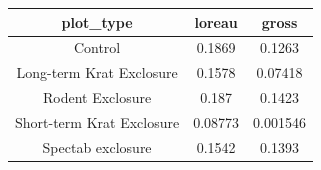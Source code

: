 \documentclass[]{article}
\begin{document}
\begin{longtable}[]{@{}ccc@{}}
\toprule
\begin{minipage}[b]{0.33\columnwidth}\centering\strut
plot\_type\strut
\end{minipage} & \begin{minipage}[b]{0.11\columnwidth}\centering\strut
loreau\strut
\end{minipage} & \begin{minipage}[b]{0.11\columnwidth}\centering\strut
gross\strut
\end{minipage}\tabularnewline
\midrule
\endhead
\begin{minipage}[t]{0.33\columnwidth}\centering\strut
Control\strut
\end{minipage} & \begin{minipage}[t]{0.11\columnwidth}\centering\strut
0.1869\strut
\end{minipage} & \begin{minipage}[t]{0.11\columnwidth}\centering\strut
0.1263\strut
\end{minipage}\tabularnewline
\begin{minipage}[t]{0.33\columnwidth}\centering\strut
Long-term Krat Exclosure\strut
\end{minipage} & \begin{minipage}[t]{0.11\columnwidth}\centering\strut
0.1578\strut
\end{minipage} & \begin{minipage}[t]{0.11\columnwidth}\centering\strut
0.07418\strut
\end{minipage}\tabularnewline
\begin{minipage}[t]{0.33\columnwidth}\centering\strut
Rodent Exclosure\strut
\end{minipage} & \begin{minipage}[t]{0.11\columnwidth}\centering\strut
0.187\strut
\end{minipage} & \begin{minipage}[t]{0.11\columnwidth}\centering\strut
0.1423\strut
\end{minipage}\tabularnewline
\begin{minipage}[t]{0.33\columnwidth}\centering\strut
Short-term Krat Exclosure\strut
\end{minipage} & \begin{minipage}[t]{0.11\columnwidth}\centering\strut
0.08773\strut
\end{minipage} & \begin{minipage}[t]{0.11\columnwidth}\centering\strut
0.001546\strut
\end{minipage}\tabularnewline
\begin{minipage}[t]{0.33\columnwidth}\centering\strut
Spectab exclosure\strut
\end{minipage} & \begin{minipage}[t]{0.11\columnwidth}\centering\strut
0.1542\strut
\end{minipage} & \begin{minipage}[t]{0.11\columnwidth}\centering\strut
0.1393\strut
\end{minipage}\tabularnewline
\bottomrule
\end{longtable}
\end{document}
